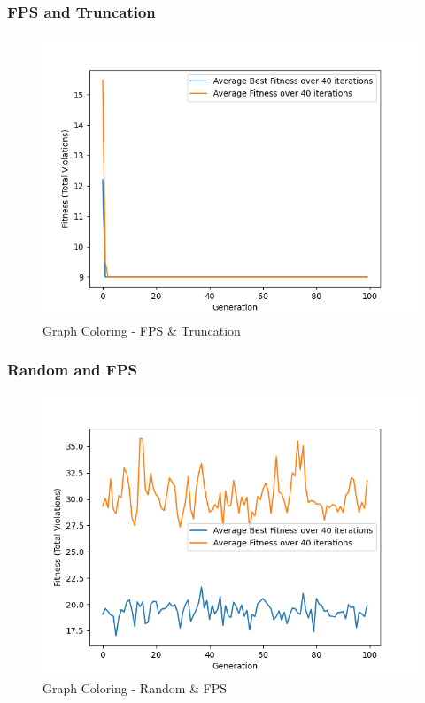 \documentclass[11pt, letterpaper]{article}
\begin{document}
\subsubsection {FPS and Truncation}
\begin{figure}[H]
    \centering
    \includegraphics[scale = 0.6]{images/graphcoloring_fp_tr.png}
    \caption {Graph Coloring - FPS \& Truncation}
    \label {fig:gcFT}
\end{figure}

\subsubsection {Random and FPS}
\begin{figure}[H]
    \centering
    \includegraphics[scale = 0.6]{images/graphcoloring_rd_fp.png}
    \caption {Graph Coloring - Random \& FPS}
    \label {fig:gcRB}
\end{figure}
\end{document}
